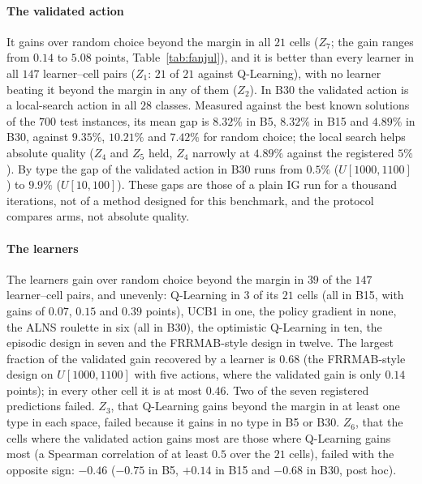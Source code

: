\paragraph{The validated action} It gains over random choice beyond the margin in all $21$ cells ($Z_7$; the gain ranges from $0.14$ to $5.08$ points, Table~\ref{tab:fanjul}), and it is better than every learner in all $147$ learner--cell pairs ($Z_1$: $21$ of $21$ against Q-Learning), with no learner beating it beyond the margin in any of them ($Z_2$). In B30 the validated action is a local-search action in all $28$ classes. Measured against the best known solutions of the $700$ test instances, its mean gap is $8.32\%$ in B5, $8.32\%$ in B15 and $4.89\%$ in B30, against $9.35\%$, $10.21\%$ and $7.42\%$ for random choice; the local search helps absolute quality ($Z_4$ and $Z_5$ held, $Z_4$ narrowly at $4.89\%$ against the registered $5\%$). By type the gap of the validated action in B30 runs from $0.5\%$ ($U[1000,1100]$) to $9.9\%$ ($U[10,100]$). These gaps are those of a plain IG run for a thousand iterations, not of a method designed for this benchmark, and the protocol compares arms, not absolute quality.

\paragraph{The learners} The learners gain over random choice beyond the margin in $39$ of the $147$ learner--cell pairs, and unevenly: Q-Learning in $3$ of its $21$ cells (all in B15, with gains of $0.07$, $0.15$ and $0.39$ points), UCB1 in one, the policy gradient in none, the ALNS roulette in six (all in B30), the optimistic Q-Learning in ten, the episodic design in seven and the FRRMAB-style design in twelve. The largest fraction of the validated gain recovered by a learner is $0.68$ (the FRRMAB-style design on $U[1000,1100]$ with five actions, where the validated gain is only $0.14$ points); in every other cell it is at most $0.46$. Two of the seven registered predictions failed. $Z_3$, that Q-Learning gains beyond the margin in at least one type in each space, failed because it gains in no type in B5 or B30. $Z_6$, that the cells where the validated action gains most are those where Q-Learning gains most (a Spearman correlation of at least $0.5$ over the $21$ cells), failed with the opposite sign: $-0.46$ ($-0.75$ in B5, $+0.14$ in B15 and $-0.68$ in B30, post hoc).

